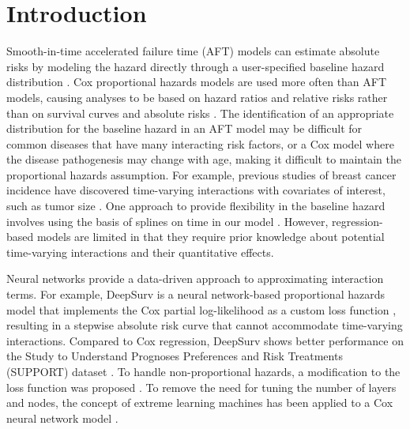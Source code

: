 \documentclass[AMA,STIX1COL,]{WileyNJD-v2}
\begin{document}

\maketitle

\hypertarget{introduction}{%
\section{Introduction}\label{introduction}}

Smooth-in-time accelerated failure time (AFT) models can estimate
absolute risks by modeling the hazard directly through a user-specified
baseline hazard distribution \citep{kleinbaum2012survival}. Cox
proportional hazards models are used more often than AFT models, causing
analyses to be based on hazard ratios and relative risks rather than on
survival curves and absolute risks \citep{hanley2009}. The
identification of an appropriate distribution for the baseline hazard in
an AFT model may be difficult for common diseases that have many
interacting risk factors, or a Cox model where the disease pathogenesis
may change with age, making it difficult to maintain the proportional
hazards assumption. For example, previous studies of breast cancer
incidence have discovered time-varying interactions with covariates of
interest, such as tumor size \citep{coradini2000time}. One approach to
provide flexibility in the baseline hazard involves using the basis of
splines on time in our model \citep{royston2002flexible}. However,
regression-based models are limited in that they require prior knowledge
about potential time-varying interactions and their quantitative
effects.

Neural networks provide a data-driven approach to approximating
interaction terms. For example, DeepSurv is a neural network-based
proportional hazards model that implements the Cox partial
log-likelihood as a custom loss function \citep{katzman2018DeepSurv},
resulting in a stepwise absolute risk curve that cannot accommodate
time-varying interactions. Compared to Cox regression, DeepSurv shows
better performance on the Study to Understand Prognoses Preferences and
Risk Treatments (SUPPORT) dataset \citep{knaus1995SUPPORT}. To handle
non-proportional hazards, a modification to the loss function was
proposed \citep{faraggi1995neural}. To remove the need for tuning the
number of layers and nodes, the concept of extreme learning machines has
been applied to a Cox neural network model \citep{wang2019extreme}.
\end{document}
